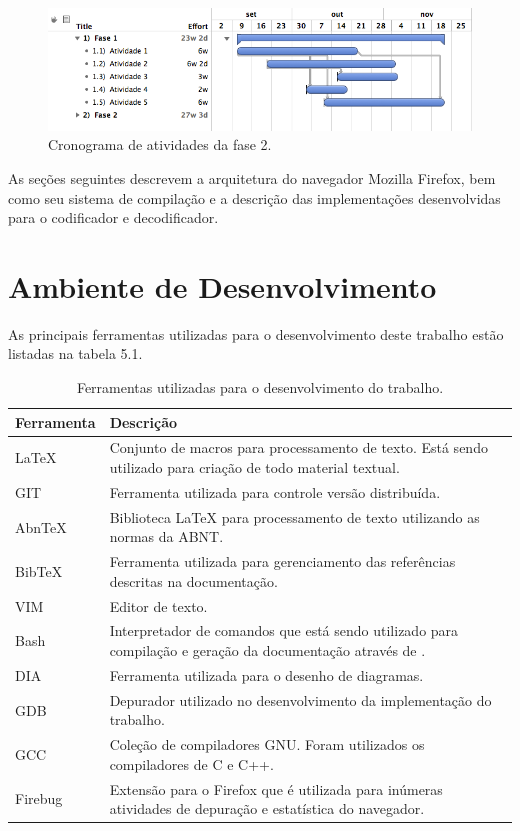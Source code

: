 \documentclass[espaco=simples,appendix=Name]{abnt}
\begin{document}
\begin{figure}[h]
  \centering
    \includegraphics[scale=0.4]{fase2.png}
  \caption{Cronograma de atividades da fase 2.}
\end{figure}

As seções seguintes descrevem a arquitetura do navegador Mozilla Firefox, bem como seu sistema de compilação e a descrição das implementações desenvolvidas para o codificador e decodificador.

\section{Ambiente de Desenvolvimento}

As principais ferramentas utilizadas para o desenvolvimento deste trabalho estão listadas na tabela 5.1.

\begin{table}[ht]
	\centering
	\caption{Ferramentas utilizadas para o desenvolvimento do trabalho.
	\label{tbl:padc}}{
		\vspace{0.3cm}
		\begin{tabular}{|l|p{14cm}|}
	    	\hline
			\textbf{Ferramenta} & \textbf{Descrição} \\
			\hline
			LaTeX		& Conjunto de macros para processamento de texto. Está sendo utilizado para criação de todo material textual. \\
			\hline
			GIT		& Ferramenta utilizada para controle versão distribuída. \\
			\hline
			AbnTeX		& Biblioteca LaTeX para processamento de texto utilizando as normas da ABNT. \\
			\hline
			BibTeX		& Ferramenta utilizada para gerenciamento das referências descritas na documentação. \\
			\hline
			VIM		& Editor de texto. \\
			\hline
			Bash		& Interpretador de comandos que está sendo utilizado para compilação e geração da documentação através de \ingles{scripts}. \\
			\hline
			DIA		& Ferramenta utilizada para o desenho de diagramas. \\
			\hline
			GDB		& Depurador utilizado no desenvolvimento da implementação do trabalho. \\
			\hline
			GCC		& Coleção de compiladores GNU. Foram utilizados os compiladores de C e C++. \\
			\hline
			Firebug		& Extensão para o Firefox que é utilizada para inúmeras atividades de depuração e estatística do navegador. \\
			\hline
		\end{tabular}
		}
\end{table}
\end{document}
